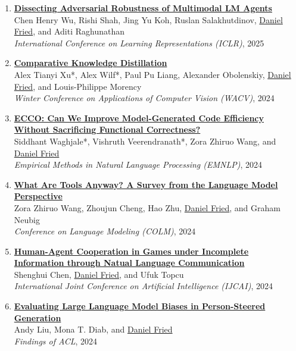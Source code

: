 \begin{enumerate}[leftmargin=-1mm,partopsep=0pt]
\item \href{https://arxiv.org/abs/2406.12814}{\textbf{Dissecting Adversarial Robustness of Multimodal LM Agents}} \\
  Chen Henry Wu, Rishi Shah, Jing Yu Koh, Ruslan Salakhutdinov, \underline{Daniel Fried}, and Aditi Raghunathan\\
  \emph{International Conference on Learning Representations (ICLR)}, 2025

\item \href{https://arxiv.org/abs/2311.02253}{\textbf{Comparative Knowledge Distillation}} \\
  Alex Tianyi Xu*, Alex Wilf*, Paul Pu Liang, Alexander Obolenskiy, \underline{Daniel Fried}, and Louis-Philippe Morency\\
  \emph{Winter Conference on Applications of Computer Vision (WACV)}, 2024

\item \href{http://arxiv.org/abs/2407.14044}{\textbf{ECCO: Can We Improve Model-Generated Code Efficiency Without Sacrificing Functional Correctness?}} \\
  Siddhant Waghjale*, Vishruth Veerendranath*, Zora Zhiruo Wang, and \underline{Daniel Fried}\\
  \emph{Empirical Methods in Natural Language Processing (EMNLP)}, 2024

\item \href{http://arxiv.org/abs/2403.15452}{\textbf{What Are Tools Anyway? A Survey from the Language Model Perspective}} \\
  Zora Zhiruo Wang, Zhoujun Cheng, Hao Zhu, \underline{Daniel Fried}, and Graham Neubig\\
  \emph{Conference on Language Modeling (COLM)}, 2024

\item \href{https://arxiv.org/abs/2405.14173}{\textbf{Human-Agent Cooperation in Games under Incomplete Information through Natual Language Communication }} \\
  Shenghui Chen, \underline{Daniel Fried}, and Ufuk Topcu\\
  \emph{International Joint Conference on Artificial Intelligence (IJCAI)}, 2024

\item \href{https://arxiv.org/abs/2405.20253}{\textbf{Evaluating Large Language Model Biases in Person-Steered Generation}} \\
  Andy Liu, Mona T. Diab, and \underline{Daniel Fried}\\
  \emph{Findings of ACL}, 2024


\end{enumerate}
